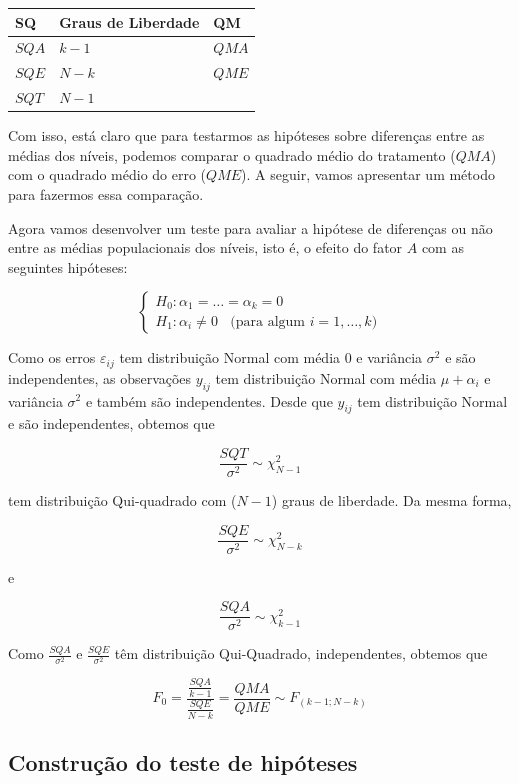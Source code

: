 \documentclass[
]{book}
\begin{document}
\begin{longtable}[]{@{}lll@{}}
\toprule
SQ & Graus de Liberdade & QM \\
\midrule
\endhead
\(SQA\) & \(k-1\) & \(QMA\) \\
\(SQE\) & \(N-k\) & \(QME\) \\
\(SQT\) & \(N-1\) & \\
\bottomrule
\end{longtable}

Com isso, está claro que para testarmos as hipóteses sobre diferenças entre as médias dos níveis, podemos comparar o quadrado médio do tratamento (\(QMA\)) com o quadrado médio do erro (\(QME\)). A seguir, vamos apresentar um método para fazermos essa comparação.

Agora vamos desenvolver um teste para avaliar a hipótese de diferenças ou não entre as médias populacionais dos níveis, isto é, o efeito do fator \(A\) com as seguintes hipóteses:

\[
\begin{cases} 
H_0: \alpha_1=\ldots=\alpha_k=0 \\
H_1:\alpha_i\neq 0~~~~\text{(para algum }i=1,\ldots,k\text{)}
\end{cases}
\]

Como os erros \(\varepsilon_{ij}\) tem distribuição Normal com média \(0\) e variância \(\sigma^2\) e são independentes, as observações \(y_{ij}\) tem distribuição Normal com média \(\mu+\alpha_i\) e variância \(\sigma^2\) e também são independentes. Desde que \(y_{ij}\) tem distribuição Normal e são independentes, obtemos que

\[\frac{SQT}{\sigma^2}\sim \chi^2_{N-1}\]

tem distribuição Qui-quadrado com (\(N-1\)) graus de liberdade. Da mesma forma,

\[\frac{SQE}{\sigma^2}\sim \chi^2_{N-k}\]

e

\[\frac{SQA}{\sigma^2}\sim \chi^2_{k-1}\]

Como \(\frac{SQA}{\sigma^2}\) e \(\frac{SQE}{\sigma^2}\) têm distribuição Qui-Quadrado, independentes, obtemos que

\[F_0=\frac{\frac{SQA}{k-1}}{\frac{SQE}{N-k}}=\frac{QMA}{QME}\sim F_{(k-1;N-k)}\]

\hypertarget{construuxe7uxe3o-do-teste-de-hipuxf3teses}{%
\subsection{Construção do teste de hipóteses}\label{construuxe7uxe3o-do-teste-de-hipuxf3teses}}
\end{document}

